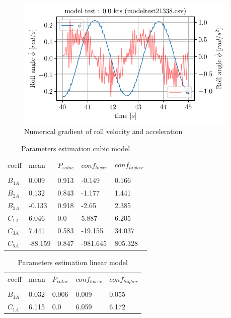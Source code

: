 \begin{figure}[H]
\begin{center}\includegraphics[width = 0.95\textwidth]{figures/roll_velocity_and_acceleration.pdf}\end{center}
\vspace{-0.7cm}
\caption{Numerical gradient of roll velocity and acceleration}
\label{fig:roll_velocity_and_acceleration}
\end{figure}
\begin{table}[H]
\scriptsize
\center
\caption{Parameters estimation cubic model}
\label{tab:parameters3}
\begin{tabular}{|l|l|l|l|l|}
\hline\addlinespace
coeff & mean & $P_{value}$ & $conf_{lower}$ & $conf_{higher}$\\
&  &  &  & \\
\hline$B_{1A}$ & 0.009 & 0.913 & -0.149 & 0.166\\
$B_{2A}$ & 0.132 & 0.843 & -1.177 & 1.441\\
$B_{3A}$ & -0.133 & 0.918 & -2.65 & 2.385\\
$C_{1A}$ & 6.046 & 0.0 & 5.887 & 6.205\\
$C_{3A}$ & 7.441 & 0.583 & -19.155 & 34.037\\
$C_{5A}$ & -88.159 & 0.847 & -981.645 & 805.328\\
\hline
\end{tabular}
\end{table}
\begin{table}[H]
\scriptsize
\center
\caption{Parameters estimation linear model}
\label{tab:parameters4}
\begin{tabular}{|l|l|l|l|l|}
\hline\addlinespace
coeff & mean & $P_{value}$ & $conf_{lower}$ & $conf_{higher}$\\
&  &  &  & \\
\hline$B_{1A}$ & 0.032 & 0.006 & 0.009 & 0.055\\
$C_{1A}$ & 6.115 & 0.0 & 6.059 & 6.172\\
\hline
\end{tabular}
\end{table}
